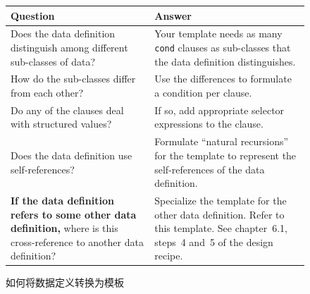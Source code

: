 \begin{figure}[htbp]
  \centering
  \footnotesize
  \setlength{\tabcolsep}{4pt}
  \begin{tabular}{@{}>{\raggedright\arraybackslash}p{}>{\raggedright\arraybackslash}p{}@{}}
    \toprule
    \textbf{Question} & \textbf{Answer} \\
    \midrule
    Does the data definition distinguish among different sub-classes of data? &
    Your template needs as many \texttt{cond} clauses as sub-classes that the data definition distinguishes. \\
    \addlinespace[4pt]
    How do the sub-classes differ from each other? &
    Use the differences to formulate a condition per clause. \\
    \addlinespace[4pt]
    Do any of the clauses deal with structured values? &
    If so, add appropriate selector expressions to the clause. \\
    \addlinespace[4pt]
    Does the data definition use self-references? &
    Formulate ``natural recursions'' for the template to represent the self-references of the data definition. \\
    \addlinespace[4pt]
    \textbf{If the data definition refers to some other data definition,} where is this cross-reference to another data definition? &
    Specialize the template for the other data definition. Refer to this template. See chapter~6.1, steps~4 and~5 of the design recipe. \\
    \bottomrule
  \end{tabular}
  \caption{如何将数据定义转换为模板}
  \label{fig:translate_data_def_to_template}
\end{figure}

